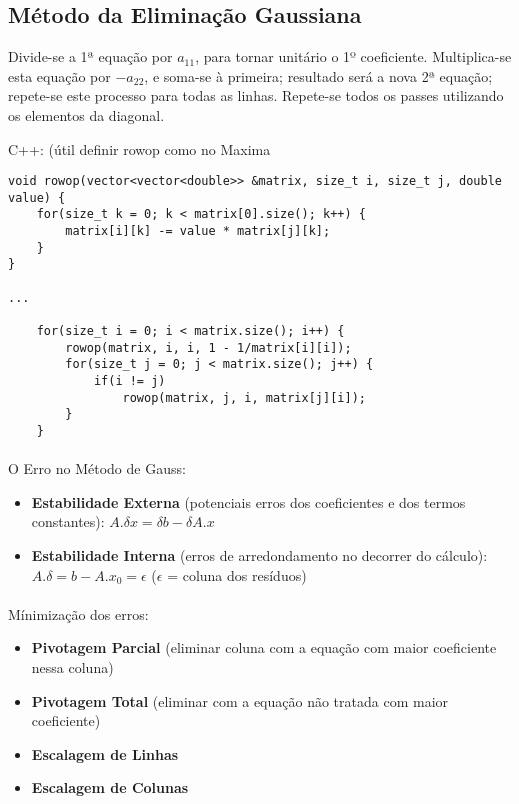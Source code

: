 \documentclass[../resumosMNUM.tex]{subfiles}
\begin{document}
 

\subsection{Método da Eliminação Gaussiana}

Divide-se a 1ª equação por \(a_{11}\), para tornar unitário o 1º coeficiente. Multiplica-se esta equação por \(-a_{22}\), e soma-se à primeira; resultado será a nova 2ª equação; repete-se este processo para todas as linhas. Repete-se todos os passes utilizando os elementos da diagonal.

C++: (útil definir rowop como no Maxima
\begin{lstlisting}
void rowop(vector<vector<double>> &matrix, size_t i, size_t j, double value) {
    for(size_t k = 0; k < matrix[0].size(); k++) {
        matrix[i][k] -= value * matrix[j][k];
    }
}

...

    for(size_t i = 0; i < matrix.size(); i++) {
        rowop(matrix, i, i, 1 - 1/matrix[i][i]);
        for(size_t j = 0; j < matrix.size(); j++) {
            if(i != j)
                rowop(matrix, j, i, matrix[j][i]);
        }
    }
\end{lstlisting}

\paragraph{}

O Erro no Método de Gauss:
\begin{itemize}
    \item \textbf{Estabilidade Externa} (potenciais erros dos coeficientes e dos termos constantes): \(A.\delta x = \delta b - \delta A.x\)
    \item \textbf{Estabilidade Interna} (erros de arredondamento no decorrer do cálculo): \(A.\delta = b - A.x_0 = \epsilon\) (\(\epsilon\) = coluna dos resíduos)
\end{itemize}

\paragraph{}

Mínimização dos erros:
\begin{itemize}
    \item \textbf{Pivotagem Parcial} (eliminar coluna com a equação com maior coeficiente nessa coluna)
    \item \textbf{Pivotagem Total} (eliminar com a equação não tratada com maior coeficiente)
    \item \textbf{Escalagem de Linhas}
    \item \textbf{Escalagem de Colunas}
\end{itemize}
\end{document}
